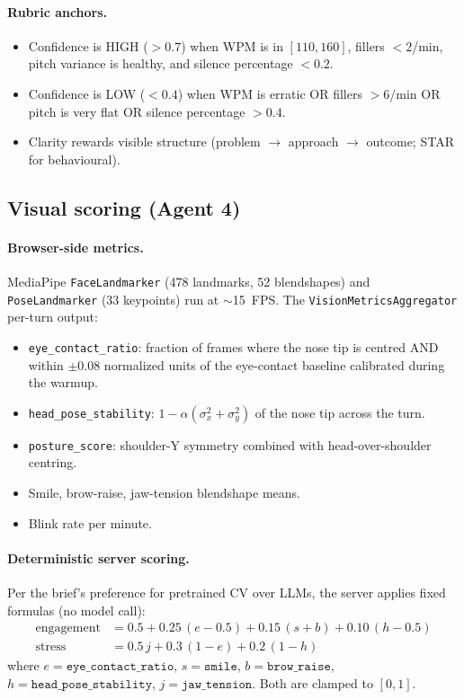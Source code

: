 \documentclass[11pt,a4paper]{article}
\begin{document}
\paragraph{Rubric anchors.}
\begin{itemize}
  \item Confidence is HIGH ($>0.7$) when WPM is in $[110, 160]$, fillers
        $<2$/min, pitch variance is healthy, and silence percentage $<0.2$.
  \item Confidence is LOW ($<0.4$) when WPM is erratic OR fillers $>6$/min
        OR pitch is very flat OR silence percentage $>0.4$.
  \item Clarity rewards visible structure (problem $\rightarrow$ approach
        $\rightarrow$ outcome; STAR for behavioural).
\end{itemize}

\subsection{Visual scoring (Agent 4)}

\paragraph{Browser-side metrics.} MediaPipe \texttt{FaceLandmarker} (478
landmarks, 52 blendshapes) and \texttt{PoseLandmarker} (33 keypoints) run
at $\sim$15~FPS. The \texttt{VisionMetricsAggregator} per-turn output:

\begin{itemize}
  \item \texttt{eye\_contact\_ratio}: fraction of frames where the nose
        tip is centred AND within $\pm 0.08$ normalized units of the
        eye-contact baseline calibrated during the warmup.
  \item \texttt{head\_pose\_stability}: $1 - \alpha (\sigma_x^2 + \sigma_y^2)$
        of the nose tip across the turn.
  \item \texttt{posture\_score}: shoulder-Y symmetry combined with
        head-over-shoulder centring.
  \item Smile, brow-raise, jaw-tension blendshape means.
  \item Blink rate per minute.
\end{itemize}

\paragraph{Deterministic server scoring.} Per the brief's preference for
pretrained CV over LLMs, the server applies fixed formulas (no model call):
\begin{align}
\mathrm{engagement} &= 0.5 + 0.25\,(e - 0.5) + 0.15\,(s + b) + 0.10\,(h - 0.5) \\
\mathrm{stress}     &= 0.5\,j + 0.3\,(1 - e) + 0.2\,(1 - h)
\end{align}
where $e = \texttt{eye\_contact\_ratio}$, $s = \texttt{smile}$, $b =
\texttt{brow\_raise}$, $h = \texttt{head\_pose\_stability}$, $j =
\texttt{jaw\_tension}$. Both are clamped to $[0, 1]$.
\end{document}
